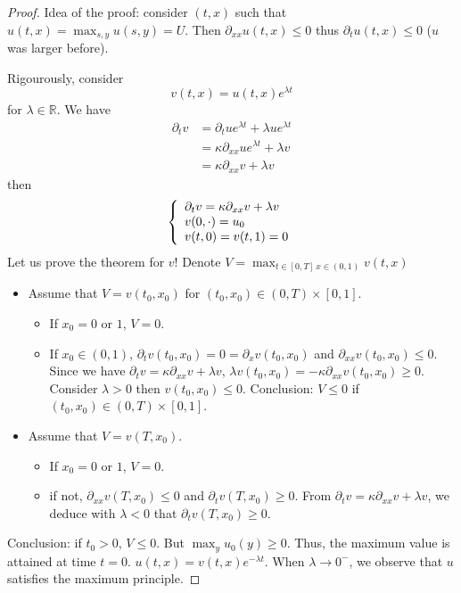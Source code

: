 \documentclass{report}
\newcommand{\R}{\ensuremath{\mathbb{R}}} %
\theoremstyle{plain}
\theoremstyle{definition}
\theoremstyle{remark}
\begin{document}
\begin{proof}
	Idea of the proof: consider $(t,x)$ such that 
	$u(t,x) = \max_{s,y} u(s,y) = U$. Then
	$\partial_{xx}u(t,x) \le 0$ thus $\partial_t u(t,x)\le 0$
	($u$ was larger before).

	Rigourously, consider 
	$$v(t,x) = u(t,x)e^{\lambda t}$$
	for $\lambda \in\R$.
	We have
	\begin{align*}
		\partial_t v &= \partial_t u e^{\lambda t}
		+\lambda u e^{\lambda t}\\
		&= \kappa \partial_{xx} u e^{\lambda t} + \lambda v\\
		&= \kappa \partial_{xx} v + \lambda v
	\end{align*}
	then
\begin{equation}
	\left\lbrace
	\begin{array}[]{l}
		\partial_t v = \kappa \partial_{xx} v + 
		\lambda v\\
		v(0,\cdot) = u_0 \\
		v(t,0) = v(t,1) = 0 
	\end{array}\right.
\end{equation}
	Let us prove the theorem for $v$!
	Denote $V =  \max_{t\in [0,T]\, x\in(0,1)} v(t,x)  $
\begin{itemize}
\item Assume that $V = v(t_0,x_0)$ for 
	$(t_0,x_0)\in (0,T)\times [0,1]$.
\begin{itemize}
	\item If $x_0 = 0$ or $1$, $V=0$.
	\item If $x_0\in (0,1)$, $\partial_t v(t_0,x_0) = 0 =
		\partial_x v(t_0,x_0) $ and 
		$\partial_{xx} v(t_0,x_0) \le 0$.
		Since we have 
		$\partial_t v = \kappa \partial_{xx} v + \lambda v$,
		$ \lambda v(t_0,x_0) = - \kappa \partial_{xx}
		v(t_0,x_0) \ge 0$.
		Consider $\lambda >0$ then $v(t_0,x_0)\le 0$.
		Conclusion: $V\le 0$ if 
		$(t_0,x_0)\in (0,T)\times [0,1]$.
\end{itemize}
\item Assume that $V = v(T,x_0)$.
\begin{itemize}
	\item If $x_0 = 0$ or $1$, $V=0$.
	\item if not, 	$\partial_{xx} v(T,x_0) \le 0$ and
			$\partial_t v(T,x_0) \ge 0$.
	From $\partial_t v = \kappa \partial_{xx} v + \lambda v$,
	we deduce with $\lambda <0$ that $\partial_t v(T,x_0)\ge 0$.

\end{itemize}
\end{itemize}
Conclusion: if $t_0>0$, $V\le 0$.
But $\max_{y}u_0(y) \ge 0$. Thus, the maximum value is attained at
time $t=0$. $u(t,x) = v(t,x)e^{-\lambda t}$. When $\lambda\to 0^-$,
we observe that $u$ satisfies the maximum principle.
\end{proof}
\end{document}
